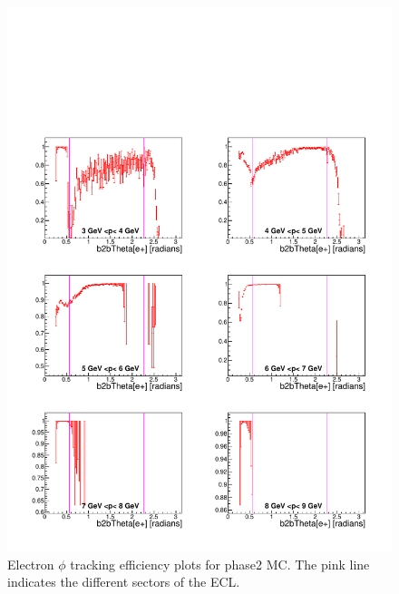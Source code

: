 \documentclass[a4paper,11pt,twosided,final,german,openbib,pdftex,listof=totoc,bibliography=totoc]{scrbook}
\begin{document}
\begin{appendix}
\clearpage





\begin{figure}[!htbp]
	\centering
	\includegraphics[width=\textwidth]{Plots/master/xPMThetaem_MC}
	\caption[Momentum $\theta$ Electron Efficiency Phase2 MC]{Electron $\phi$ tracking efficiency plots for phase2 MC. The pink line indicates the different sectors of the ECL.}
	\label{plt:PMThetaem_MC}
\end{figure}



\end{appendix}
\end{document}
